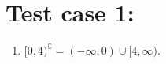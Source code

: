 
\section{Test case 1:}
\begin{enumerate}
    \item $[0,4)^\complement = (-\infty,0) \cup [4,\infty)$.
\end{enumerate}

%
